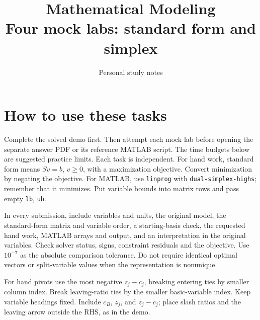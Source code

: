 \documentclass[11pt,a4paper]{article}
\title{\textbf{Mathematical Modeling}\\[2mm]\large Four mock labs: standard form and simplex}
\author{Personal study notes}
\date{}
\begin{document}
\maketitle

\section*{How to use these tasks}
Complete the solved demo first. Then attempt each mock lab before opening
the separate answer PDF or its reference MATLAB script.
The time budgets below are suggested practice limits. Each task is independent.
For hand work, standard form means $Sv=b$, $v\geq0$, with a maximization
objective. Convert minimization by negating the objective. For MATLAB, use
\texttt{linprog} with \texttt{dual-simplex-highs}; remember that it minimizes.
Put variable bounds into matrix rows and pass empty \texttt{lb}, \texttt{ub}.

In every submission, include variables and units, the original model, the
standard-form matrix and variable order, a starting-basis check, the requested
hand work, MATLAB arrays and output, and an interpretation in the original
variables. Check solver status, signs, constraint residuals and the objective.
Use $10^{-7}$ as the absolute comparison tolerance. Do not require identical
optimal vectors or split-variable values when the representation is nonunique.

For hand pivots use the most negative $z_j-c_j$, breaking entering ties by
smaller column index. Break leaving-ratio ties by the smaller basic-variable
index. Keep variable headings fixed. Include $c_B$, $z_j$, and $z_j-c_j$;
place slash ratios and the leaving arrow outside the RHS, as in the demo.
\end{document}
